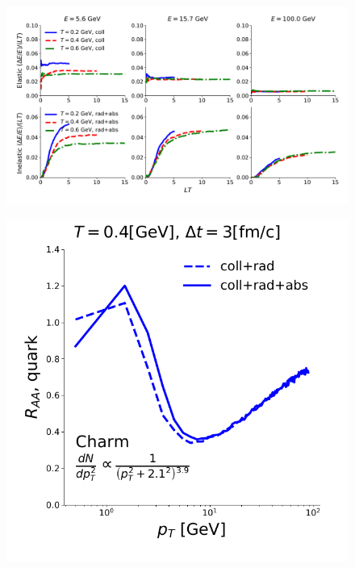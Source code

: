 \documentclass[aps, prc, reprint, amsmath, groupedaddress, nofootinbib]{revtex4-1}
\begin{document}
\begin{figure}
\includegraphics[width=\textwidth]{L_Eloss.pdf}
\caption{}\label{plots:dE-L}
\end{figure}

\begin{figure}
\includegraphics[width=\columnwidth]{BoxRaa.pdf}
\end{figure}
\end{document}
